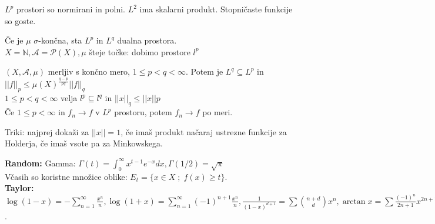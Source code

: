 \documentclass[a4paper,oneside,10pt]{article}
\theoremstyle{definition}
\newcommand{\N}{\ensuremath{\mathbb{N}}}
\newcommand{\A}{\ensuremath{\mathcal{A}}}
\renewcommand{\P}{\ensuremath{\mathcal{P}}}
\renewcommand{\N}{\ensuremath{\mathbb{N}}}
\begin{document}
$L^p$ prostori so normirani in polni. $L^2$ ima skalarni produkt. Stopničaste funkcije so goste.

Če je $\mu$ $\sigma$-končna, sta $L^p$ in $L^q$ dualna prostora.\\
$X = \N, \A = \P(X), \mu$ šteje točke: dobimo prostore $l^p$

$(X, \A, \mu)$ merljiv s končno mero, $1 \leq p < q < \infty$. Potem je $L^q \subseteq L^p$ in
$||f||_p \leq \mu(X)^{\frac{q-p}{pq}} ||f||_q$\\
$1 \leq p < q < \infty$ velja $l^p \subseteq l^q$ in $||x||_q \leq ||x||p$\\
Če $1 \leq p < \infty$ in $f_n \to f$ v $L^p$ prostoru, potem $f_n \to f$ po meri.

Triki: najprej dokaži za $||x|| = 1$, če imaš produkt načaraj ustrezne
funkcije za Holderja, če imaš vsote pa za Minkowskega.

\textbf{Random: } Gamma: $\Gamma(t) = \int_0^\infty x^{t-1} e^{-x} dx, \Gamma(1/2) = \sqrt{\pi}$\\
Včasih so koristne množice oblike: $E_t = \{x \in X \; ; \; f(x) \geq t\}.$\\
\textbf{Taylor:} $\log(1-x) = - \sum_{n=1}^\infty \frac{x^n}{n},
\log(1 + x) = \sum_{n=1}^\infty (-1)^{n+1} \frac{x^n}{n},
\frac{1}{(1-x)^{d+1}} = \sum \binom{n+d}{d} x^n,
\arctan x = \sum \frac{(-1)^n}{2n+1} x^{2n+1},
(1+x)^\alpha = \sum_{n=0}^\infty \binom{\alpha}{n} x^n$.
\end{document}
